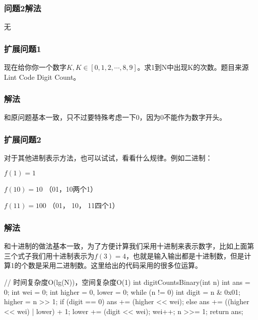 \subsubsection{问题2解法}
无

\subsubsection{扩展问题1}
现在给你你一个数字$K, K \in [0, 1, 2, \cdots , 8, 9]$。求1到N中出现K的次数。题目来源 Lint Code Digit Count。

\subsubsection{解法}
和原问题基本一致，只不过要特殊考虑一下0，因为0不能作为数字开头。

\subsubsection{扩展问题2}
对于其他进制表示方法，也可以试试，看看什么规律。例如二进制：

$f(1) = 1$

$f(10) = 10$ （01，10两个1）

$f(11) = 100$ （01， 10， 11四个1）


\subsubsection{解法}
和十进制的做法基本一致，为了方便计算我们采用十进制来表示数字，比如上面第三个式子我们用十进制表示为$f(3) = 4$，也就是输入输出都是十进制数，但是计算1的个数是采用二进制数。这里给出的代码采用的很多位运算。
\begin{Code}
// 时间复杂度O(lg(N))，空间复杂度O(1)
int digitCountsBinary(int n) {
    int ans = 0;
    int wei = 0;
    int higher = 0, lower = 0;
    while (n != 0) {
        int digit = n & 0x01;
        higher = n >> 1;
        if (digit == 0) {
            ans += (higher << wei);
        } else {
        ans += ((higher << wei) | lower) + 1;
        }
        lower += (digit << wei);
        wei++;
        n >>= 1;
    }
    return ans;
}
\end{Code}